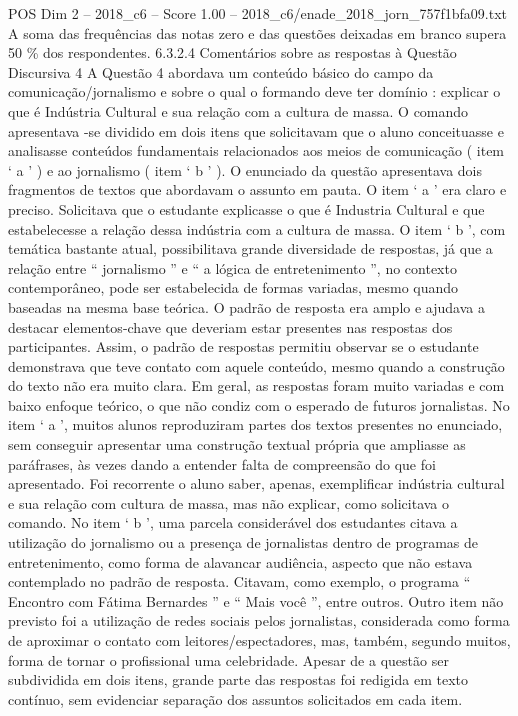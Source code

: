 \begin{textsample}{POS Dim 2 – 2018\_c6 – Score 1.00 – 2018\_c6/enade\_2018\_jorn\_757f1bfa09.txt}
A soma das frequências das notas zero e das questões deixadas em branco supera 50 \% dos respondentes. 6.3.2.4 Comentários sobre as respostas à Questão Discursiva 4 A Questão 4 abordava um conteúdo básico do campo da comunicação/jornalismo e sobre o qual o formando deve ter domínio : explicar o que é Indústria Cultural e sua relação com a cultura de massa.
O comando apresentava -se dividido em dois itens que solicitavam que o aluno conceituasse e analisasse conteúdos fundamentais relacionados aos meios de comunicação ( item ‘ a ’ ) e ao jornalismo ( item ‘ b ’ ).
O enunciado da questão apresentava dois fragmentos de textos que abordavam o assunto em pauta.
O item ‘ a ’ era claro e preciso.
Solicitava que o estudante explicasse o que é Industria Cultural e que estabelecesse a relação dessa indústria com a cultura de massa.
O item ‘ b ’, com temática bastante atual, possibilitava grande diversidade de respostas, já que a relação entre “ jornalismo ” e “ a lógica de entretenimento ”, no contexto contemporâneo, pode ser estabelecida de formas variadas, mesmo quando baseadas na mesma base teórica.
O padrão de resposta era amplo e ajudava a destacar elementos-chave que deveriam estar presentes nas respostas dos participantes.
Assim, o padrão de respostas permitiu observar se o estudante demonstrava que teve contato com aquele conteúdo, mesmo quando a construção do texto não era muito clara.
Em geral, as respostas foram muito variadas e com baixo enfoque teórico, o que não condiz com o esperado de futuros jornalistas.
No item ‘ a ’, muitos alunos reproduziram partes dos textos presentes no enunciado, sem conseguir apresentar uma construção textual própria que ampliasse as paráfrases, às vezes dando a entender falta de compreensão do que foi apresentado.
Foi recorrente o aluno saber, apenas, exemplificar indústria cultural e sua relação com cultura de massa, mas não explicar, como solicitava o comando.
No item ‘ b ’, uma parcela considerável dos estudantes citava a utilização do jornalismo ou a presença de jornalistas dentro de programas de entretenimento, como forma de alavancar audiência, aspecto que não estava contemplado no padrão de resposta.
Citavam, como exemplo, o programa “ Encontro com Fátima Bernardes ” e “ Mais você ”, entre outros.
Outro item não previsto foi a utilização de redes sociais pelos jornalistas, considerada como forma de aproximar o contato com leitores/espectadores, mas, também, segundo muitos, forma de tornar o profissional uma celebridade.
Apesar de a questão ser subdividida em dois itens, grande parte das respostas foi redigida em texto contínuo, sem evidenciar separação dos assuntos solicitados em cada item.

\end{textsample}
